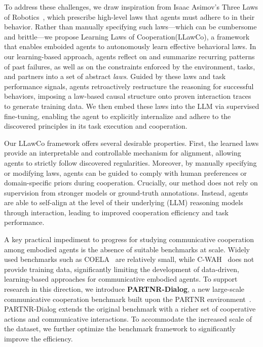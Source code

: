 \documentclass{article}
\theoremstyle{plain}
\theoremstyle{definition}
\theoremstyle{remark}
\newcommand{\fullname}{Learning Laws of Cooperation\xspace}
\newcommand{\name}{LLawCo\xspace}
\begin{document}
To address these challenges, we draw inspiration from Isaac Asimov’s Three Laws of Robotics~\cite{asimov2004robot}, which prescribe high-level laws that agents must adhere to in their behavior. Rather than manually specifying such laws—which can be cumbersome and brittle—we propose \fullname (\name), a framework that enables emboided agents to autonomously learn effective behavioral laws. In our learning-based approach, agents reflect on and summarize recurring patterns of past failures, as well as on the constraints enforced by the environment, tasks, and partners into a set of abstract \emph{laws}. Guided by these laws and task performance signals, agents retroactively restructure the reasoning for successful behaviors, imposing a law-based causal structure onto proven interaction traces to generate training data. We then embed these laws into the LLM via supervised fine-tuning, enabling the agent to explicitly internalize and adhere to the discovered principles in its task execution and cooperation.

Our \name framework offers several desirable properties. First, the learned laws provide an interpretable and controllable mechanism for alignment, allowing agents to strictly follow discovered regularities. Moreover, by manually specifying or modifying laws, agents can be guided to comply with human preferences or domain-specific priors during cooperation. Crucially, our method does not rely on supervision from stronger models or ground-truth annotations. Instead, agents are able to self-align at the level of their underlying (LLM) reasoning models through interaction, leading to improved cooperation efficiency and task performance.

A key practical impediment to progress for studying communicative cooperation among embodied agents is the absence of suitable benchmarks at scale. Widely used benchmarks such as COELA~\cite{coela, tdw-transport} are relatively small, while C-WAH~\cite{wah, virtualhome} does not provide training data, significantly limiting the development of data-driven, learning-based approaches for communicative embodied agents. To support research in this direction, we introduce \textbf{PARTNR-Dialog}, a new large-scale communicative cooperation benchmark built upon the PARTNR environment~\cite{partnr, habitat3}. PARTNR-Dialog extends the original benchmark with a richer set of cooperative actions and communicative interactions. To accommodate the increased scale of the dataset, we further optimize the benchmark framework to significantly improve the efficiency.
\end{document}
